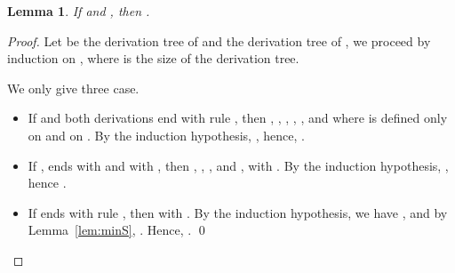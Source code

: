 \documentclass[preprint]{elsarticle}
\newtheorem{lemma}[theorem]{Lemma}
\begin{document}
        \begin{lemma}\label{lem:min}
          If  and , then .
        \end{lemma}
        \begin{proof}
          Let  be the derivation tree of  and  the
          derivation tree of , we proceed by induction on
          , where  is the size of the derivation tree.

          We only give three case.
          
          \begin{itemize}
          \item If  and both derivations end with rule
            , then , , 
            ,
            ,
            ,
            and  where  is defined only on  and 
            on .
            By the induction hypothesis, ,
            hence, .
          \item If ,  ends with  and  with
            , then 
            , ,
            , and , with .
            By the induction hypothesis,
            ,
            hence .
          \item If  ends with rule , then  with
            . By the induction hypothesis, we have
            , and by Lemma~\ref{lem:minS},
            .
            Hence, .
            \qed
          \end{itemize}
        \end{proof}
\end{document}
